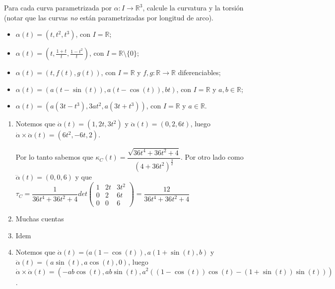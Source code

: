 \documentclass[11pt]{article}
\newcommand{\R}{{\mathbb{R}}}
\newenvironment{proof}[1][Demostraci\'on]{\begin{trivlist}
		\item[\hskip \labelsep {\bfseries #1}]}{\end{trivlist}}
\begin{document}
\begin{enumerate}
	\item Para cada curva parametrizada por $\alpha: I \to \R^3$, calcule la curvatura y la
	torsi\'on (notar que las curvas \emph{no} est\'an parametrizadas por longitud de arco).
	
	\begin{itemize}
		\item $\alpha(t) = (t,t^2,t^3)$, con $I = \R$;
		\item $\alpha(t) = (t,\frac{1+t}{t},\frac{1-t^2}{t})$, con $I = \R \setminus\{0\}$;
		\item $\alpha(t) = (t,f(t),g(t))$, con $I = \R$ y $f,g: \R \to \R$ diferenciables;
		\item $\alpha(t) = (a(t-\sin(t)),a(t-\cos(t)),bt)$, con $I = \R$ y $a,b \in \R$;
		\item $\alpha(t) = (a(3t-t^3),3at^2,a(3t+t^3))$, con $I = \R$ y $a \in \R$.
	\end{itemize}
	
	\label{Ejercicio 1}
	
	\begin{proof}
		
		\begin{enumerate}
			
			\item Notemos que $\dot{\alpha}(t) = (1,2t,3t^2)$ y $\ddot{\alpha}(t) = (0,2,6t)$, luego $\dot{\alpha} \times \ddot{\alpha} (t) = (6t^2, -6t ,2)$. 
			
			Por lo tanto sabemos que $\kappa_C (t) = \dfrac{\sqrt{36t^4 + 36 t^2 + 4}}{(4 + 36t^2)^{\frac{3}{2}}}$. Por otro lado como $\dddot{\alpha}(t) = (0,0,6)$ y que $\tau_C = \dfrac{1}{36t^4 + 36 t^2 + 4} det \left(
			\begin{array}{ccc}
			1 & 2t & 3t^2 \\ 
			0 & 2 & 6t \\ 
			0 & 0 & 6
			\end{array} 
			\right) = \dfrac{12}{36t^4 + 36 t^2 + 4}$
			
			\item Muchas cuentas
			
			\item Idem
			
			\item Notemos que $\dot{\alpha}(t) = (a(1-\cos(t)),a(1+\sin(t),b)$ y $\ddot{\alpha}(t) = (a\sin(t),a\cos(t),0)$, luego $\dot{\alpha} \times \ddot{\alpha} (t) = (-ab\cos(t), ab\sin(t) ,a^2((1-\cos(t))\cos(t) - (1+\sin(t))\sin(t)))$. 
			

\end{enumerate}
\end{proof}
\end{enumerate}
\end{document}
